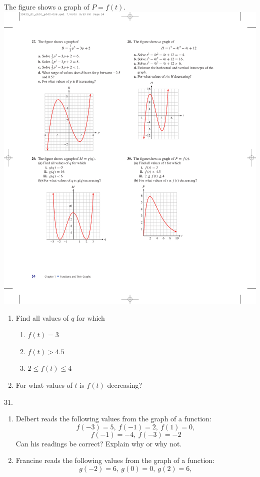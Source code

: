 \documentclass[10pt,]{book}
\theoremstyle{plain}
\theoremstyle{definition}
\theoremstyle{definition}
\theoremstyle{definition}
\theoremstyle{definition}
\numberwithin{equation}{part}
\newcommand{\gt}{>}
\begin{document}
\begin{exerciselist}
\begin{exercisegroup}
\exercise[30.]\hypertarget{exercise-187}{}The figure shows a graph of \(P = f (t)\). \includegraphics[width=0.5\linewidth]{images/fig-ex-1-3-30}
 \leavevmode%
\begin{enumerate}[label=*\alph**]
\item\hypertarget{li-810}{}Find all values of \(q\) for which %
\begin{enumerate}[label=*\roman**]
\item\hypertarget{li-811}{}\(f (t) = 3\)%
\item\hypertarget{li-812}{}\(f (t)\gt 4.5\)%
\item\hypertarget{li-813}{}\(2\le f (t)\le 4\)%
\end{enumerate}
%
\item\hypertarget{li-814}{}For what values of \(t\) is \(f (t)\) decreasing?%
\end{enumerate}
%
\end{exercisegroup}
\par\smallskip\noindent
\item[31.]\hypertarget{exercise-188}{}\leavevmode%
\begin{enumerate}[label=*\alph**]
\item\hypertarget{li-815}{}Delbert reads the following values from the graph of a function:%
\begin{equation*}
f (-3) = 5, ~f (-1) = 2, ~f (1) = 0,
\end{equation*}
%
\begin{equation*}
f (-1) = -4, ~f (-3) = -2
\end{equation*}
Can his readings be correct? Explain why or why not.%
\item\hypertarget{li-816}{}Francine reads the following values from the graph of a function:%
\begin{equation*}
g(-2) = 6, ~g(0) = 0, ~g(2) = 6,

\end{equation*}
\end{enumerate}
\end{exerciselist}
\end{document}
